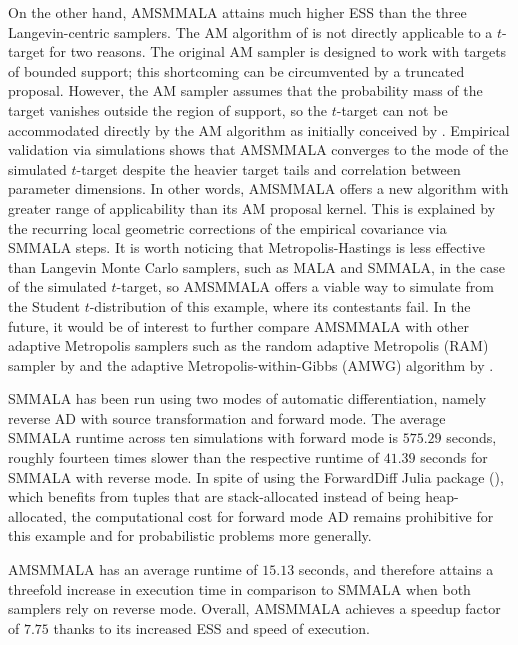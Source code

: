 \documentclass[twoside,11pt]{article}
\begin{document}
On the other hand, AMSMMALA attains much higher ESS than the three Langevin-centric samplers. The AM algorithm of 
\cite{haa_sak_tam__ana} is not directly applicable to a $t$-target for two reasons. The original AM sampler is designed to 
work with targets of bounded support; this shortcoming can be circumvented by a truncated proposal. However, the AM sampler 
assumes that the probability mass of the target vanishes outside the region of support, so the $t$-target can not be 
accommodated directly by the AM algorithm as initially conceived by \cite{haa_sak_tam__ana}. Empirical validation via 
simulations shows that AMSMMALA converges to the mode of the simulated $t$-target despite the heavier target tails and 
correlation between parameter dimensions. In other words, AMSMMALA offers a new algorithm with greater range of applicability
than its AM proposal kernel. This is explained by the recurring local geometric corrections of the empirical covariance via 
SMMALA steps. It is worth noticing that Metropolis-Hastings is less effective than Langevin Monte Carlo samplers, such as 
MALA and SMMALA, in the case of the simulated $t$-target, so AMSMMALA offers a viable way to simulate from the Student 
$t$-distribution of this example, where its contestants fail. In the future, it would be of interest to further compare 
AMSMMALA with other adaptive Metropolis samplers such as the random adaptive Metropolis (RAM) sampler by \cite{vih__rob} and 
the adaptive Metropolis-within-Gibbs (AMWG) algorithm by \cite{rob_ros__exa}.

SMMALA has been run using two modes of automatic differentiation, namely reverse AD with source transformation and forward 
mode. The average SMMALA runtime across ten simulations with forward mode is $575.29$ seconds, roughly fourteen times slower
than the respective runtime of $41.39$ seconds for SMMALA with reverse mode. In spite of using the ForwardDiff Julia 
package (\cite{rev_lub_pap__for}), which benefits from tuples that are stack-allocated instead of being heap-allocated, the
computational cost for forward mode AD remains prohibitive for this example and for probabilistic problems more generally.

AMSMMALA has an average runtime of $15.13$ seconds, and therefore attains a threefold increase in execution time in
comparison to SMMALA when both samplers rely on reverse mode. Overall, AMSMMALA achieves a speedup factor of $7.75$ thanks to
its increased ESS and speed of execution.
\end{document}
